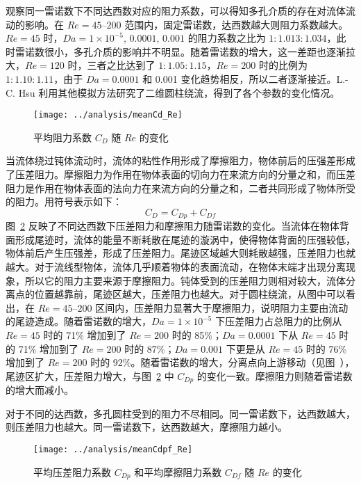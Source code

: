 观察同一雷诺数下不同达西数对应的阻力系数，可以得知多孔介质的存在对流体流动的影响。在 $Re=45$--$200$ 范围内，固定雷诺数，达西数越大则阻力系数越大。$Re=45$ 时，$Da=1\times 10^{-5},\,0.0001,\,0.001$ 的阻力系数之比为 $1:1.013:1.034$，此时雷诺数很小，多孔介质的影响并不明显。随着雷诺数的增大，这一差距也逐渐拉大，$Re=120$ 时，三者之比达到了 $1:1.05:1.15$，$Re=200$ 时的比例为 $1:1.10:1.11$，由于 $Da=0.0001$ 和 0.001 变化趋势相反，所以二者逐渐接近。L.-C. Hsu\cite{Hsu2016} 利用其他模拟方法研究了二维圆柱绕流，得到了各个参数的变化情况。%

\begin{figure}
	\centering
	\texttt{[image: ../analysis/meanCd\_Re]}
	\caption{平均阻力系数 $C_D$ 随 $Re$ 的变化}
	\label{fig: meanCd}
\end{figure}

当流体绕过钝体流动时，流体的粘性作用形成了摩擦阻力，物体前后的压强差形成了压差阻力。摩擦阻力为作用在物体表面的切向力在来流方向的分量之和，而压差阻力是作用在物体表面的法向力在来流方向的分量之和，二者共同形成了物体所受的阻力。用符号表示如下：
\begin{equation}
	C_D = C_{Dp} + C_{Df}
\end{equation}
图~\ref{fig: meanCdpf} 反映了不同达西数下压差阻力和摩擦阻力随雷诺数的变化。当流体在物体背面形成尾迹时，流体的能量不断耗散在尾迹的漩涡中，使得物体背面的压强较低，物体前后产生压强差，形成了压差阻力。尾迹区域越大则耗散越强，压差阻力也就越大。对于流线型物体，流体几乎顺着物体的表面流动，在物体末端才出现分离现象，所以它的阻力主要来源于摩擦阻力。钝体受到的压差阻力则相对较大，流体分离点的位置越靠前，尾迹区越大，压差阻力也越大。对于圆柱绕流，从图中可以看出，在 $Re=45$--$200$ 区间内，压差阻力显著大于摩擦阻力，说明阻力主要由流动的尾迹造成。随着雷诺数的增大，$Da=1\times 10^{-5}$ 下压差阻力占总阻力的比例从 $Re=45$ 时的 71\% 增加到了 $Re=200$ 时的 85\%；$Da=0.0001$ 下从 $Re=45$ 时的 71\% 增加到了 $Re=200$ 时的 87\%；$Da=0.001$ 下更是从 $Re=45$ 时的 76\% 增加到了 $Re=200$ 时的 92\%。随着雷诺数的增大，分离点向上游移动（见图~），尾迹区扩大，压差阻力增大，与图~\ref{fig: meanCdpf} 中 $C_{Dp}$ 的变化一致。摩擦阻力则随着雷诺数的增大而减小。%

对于不同的达西数，多孔圆柱受到的阻力不尽相同。同一雷诺数下，达西数越大，则压差阻力也越大。同一雷诺数下，达西数越大，摩擦阻力越小。%

\begin{figure}
	\centering
	\texttt{[image: ../analysis/meanCdpf\_Re]}
	\caption{平均压差阻力系数 $C_{Dp}$ 和平均摩擦阻力系数 $C_{Df}$ 随 $Re$ 的变化}
	\label{fig: meanCdpf}
\end{figure}

